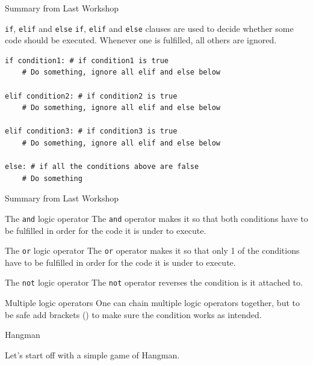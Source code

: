 \documentclass[dvipsnames, svgnames, x11names]{beamer}
\begin{document}
\begin{frame}[fragile]{Summary from Last Workshop}
\begin{block}{\texttt{if}, \texttt{elif} and \texttt{else}}
\texttt{if}, \texttt{elif} and \texttt{else} clauses are used to decide whether some code should be executed.
Whenever one is fulfilled, all others are ignored.
\begin{verbatim}
if condition1: # if condition1 is true
    # Do something, ignore all elif and else below

elif condition2: # if condition2 is true
    # Do something, ignore all elif and else below

elif condition3: # if condition3 is true
    # Do something, ignore all elif and else below

else: # if all the conditions above are false
    # Do something
\end{verbatim}
\end{block}
\end{frame}

\begin{frame}[fragile]{Summary from Last Workshop}
\begin{block}{The \texttt{and} logic operator}
The \texttt{and} operator makes it so that both conditions have to be fulfilled in order for the code it is under to execute.
\end{block}
\begin{block}{The \texttt{or} logic operator}
The \texttt{or} operator makes it so that only 1 of the conditions have to be fulfilled in order for the code it is under to execute.
\end{block}
\begin{block}{The \texttt{not} logic operator}
The \texttt{not} operator reverses the condition is it attached to.
\end{block}
\begin{alertblock}{Multiple logic operators}
One can chain multiple logic operators together, but to be safe add brackets () to make sure the condition works as intended.
\end{alertblock}
\end{frame}

\begin{frame}[fragile]{Hangman}
    \begin{center}
        Let's start off with a simple game of Hangman.
    \end{center}
\end{frame}
\end{document}
